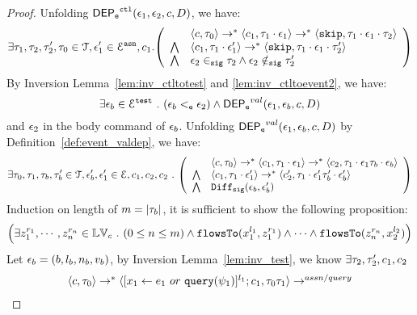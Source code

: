 {\begin{proof}
Unfolding $\mathsf{DEP_{\mathtt{e}}}^{\mathtt{{ctl}}}(\mathtt{\epsilon}_1, \mathtt{\epsilon}_2, c, D)$, we have:
%
\[
\exists \vtrace_1, \vtrace_2, \vtrace_2', \vtrace_0 \in \mathcal{T}, 
\event_1' \in \eventset^{\asn}, {c}_1.
\left(
\begin{array}{ll}   
  & \config{{c}, \vtrace_0} \rightarrow^{*} 
    \config{{c}_1, \vtrace_1 \cdot \event_1}  \rightarrow^{*} 
    \config{\eskip,  \vtrace_1 \cdot \event_1 \cdot \vtrace_2} 
  \\ 
  \bigwedge &
  \config{{c}_1, \vtrace_1 \cdot \event_1'}  \rightarrow^{*} 
  \config{\eskip,  \vtrace_1 \cdot \event_1 \cdot \vtrace_2' } 
  \\
  \bigwedge &
  \event_2 \sigin \vtrace_2 \land \event_2 \notsigin \vtrace_2'
\end{array}
\right)
 \]
 By {Inversion Lemma~\ref{lem:inv_ctltotest} and \ref{lem:inv_ctltoevent2}}, we have:
 \[
   \exists \mathtt{\epsilon}_b \in \mathcal{E}^{\mathtt{{test}}} ~.~ (\mathtt{\epsilon}_b <_{\mathtt{e}} \mathtt{\epsilon}_2) \land \mathsf{DEP_{\mathtt{e}}}^{val}(\mathtt{\epsilon}_1, \mathtt{\epsilon}_b, c, D)
 \]
 and $\mathtt{\epsilon}_2$ in the body command of $\mathtt{\epsilon}_b$.
 Unfolding $\mathsf{DEP_{\mathtt{e}}}^{val}(\mathtt{\epsilon}_1, \mathtt{\epsilon}_b, c, D)$ by Definition~\ref{def:event_valdep}, we have:
\[
\exists \vtrace_0, \vtrace_1, \vtrace_b, \vtrace_b' \in \mathcal{T},  \event_b', \event_1' \in \eventset, 
{c}_1, {c}_2, {c}_2 \st
  \left(
  \begin{array}{ll}   
 & \config{{c}, \vtrace_0} \rightarrow^{*} 
  \config{{c}_1, \vtrace_1 \cdot \event_1}  \rightarrow^{*} 
  \config{{c}_2,  \vtrace_1 \cdot \event_1 \vtrace_b \cdot \event_b } 
  \\ 
  \bigwedge &
  \config{{c}_1, \vtrace_1 \cdot \event_1'}  \rightarrow^{*} 
  \config{{c}_2',  \vtrace_1 \cdot \event_1' \vtrace_b' \cdot \event_b' } 
  \\
  \bigwedge &
   \sigdiff(\event_b,\event_b')
\end{array}
\right)
 \]
Induction on length of $m = |\mathtt{\tau}_b|$, it is sufficient to show the following proposition:
%
\[
\Big(\exists z_1^{r_1}, \cdots, z_n^{r_n} \in \mathbb{LV}_{{c}} ~.~ (0 \leq n \leq m )
 \land \mathtt{flowsTo}(x_1^{l_1}, z_1^{r_1}) \land \cdots \land \mathtt{flowsTo}(z_n^{r_n}, {x}_2^{l_2}) \Big)
\]
%
 Let $\mathtt{\epsilon}_b = (b, l_b, n_b, v_b)$, by {Inversion Lemma~\ref{lem:inv_test}},
we know $\exists \mathtt{\tau}_2, \mathtt{\tau}_2', {c}_1, {c}_2$
 \[
  \begin{array}{l}   
  \langle {c}, \mathtt{\tau}_0 \rangle 
  \rightarrow^{*} 
  \langle [\mathrel{ {x}_1 \leftarrow e_1~ or ~ {\tt query}(\psi_1) }]^{l_1} ; {c}_1, \mathtt{\tau}_0 \mathtt{\tau}_1 \rangle  \rightarrow^{assn/query}

\end{array}\]
\end{proof}}
